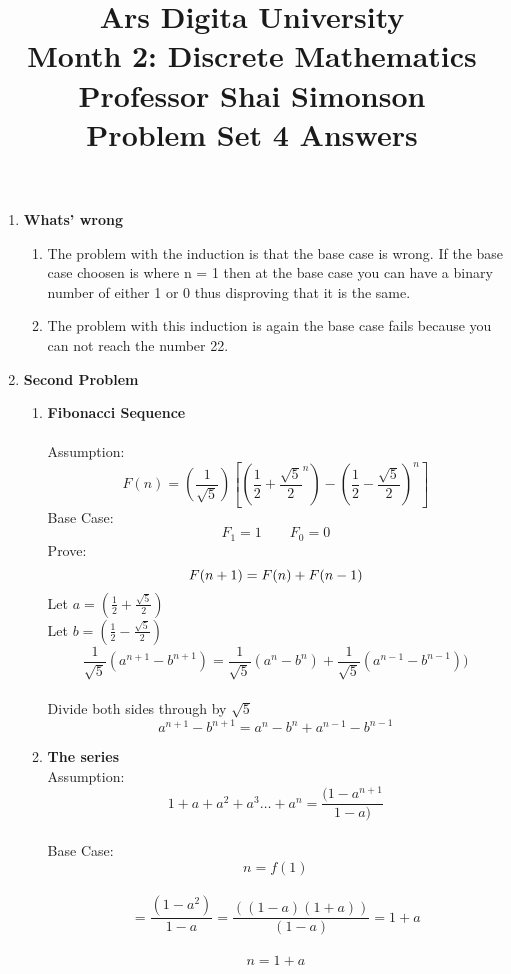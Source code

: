 \documentclass[12pt]{amsart}
\title[Problem Set 4]{Ars Digita University\\Month 2:  Discrete Mathematics\\Professor Shai Simonson\\Problem Set 4 Answers}
\newcommand{\fr}[2]{\frac{#1}{#2}}
\begin{document}
\maketitle

\begin{enumerate}
\item {\bf Whats' wrong}
\begin{enumerate}
\item {\bf}
    The problem with the induction is that the base case is wrong.  If the base case choosen is where n = 1 then at the base case you can have a binary number of either 1 or 0 thus disproving that it is the same.


\item {\bf}
    The problem with this induction is again the base case fails because you can not reach the number 22.

\end{enumerate}


\item{\bf Second Problem}
\begin{enumerate}


\item {\bf Fibonacci Sequence}\\
\\
    Assumption:
    $$  F(n) = (\fr{1}{\sqrt {5}})[(\fr{1}{2} + \fr{\sqrt{5}}{2}^n) - (\fr{1}{2} -
        \fr{\sqrt{5}}{2})^n]$$
    Base Case:
$$
    F_1 = 1 \qquad    F_0 = 0
$$
        Prove:
    $$  F(n+1) = F(n) + F(n-1) \\$$
    Let $a = (\fr{1}{2} + \fr{\sqrt{5}}{2})$\\
    Let $b = (\fr{1}{2} - \fr{\sqrt{5}}{2})$\\
$$
               \fr{1}{\sqrt{5}}(a^{n+1} - b^{n+1}) =  \fr{1}{\sqrt{5}}(a^n - b^n) + \fr{1}{\sqrt{5}}
                (a^{n-1} - b^{n-1}))
$$
\\
        Divide both sides through by  $\sqrt{5}$\\
                    $$a^{n+1} - b^{n+1} =  a^n - b^n + a^{n-1} - b^{n-1}$$




\item {\bf The series}\\


    Assumption: $$1 + a + a^2 + a^3 \ldots + a^n = \fr{(1 - a^{n+1}}{1-a)}$$\\
    Base Case: $$n = f(1)$$\\
                     $$= \fr{(1 - a^2)}{1 - a} = \fr{((1 - a)(1 + a))}{(1 - a)} = 1 + a$$\\
                  $$ n = 1 + a$$


\end{enumerate}
\end{enumerate}
\end{document}
